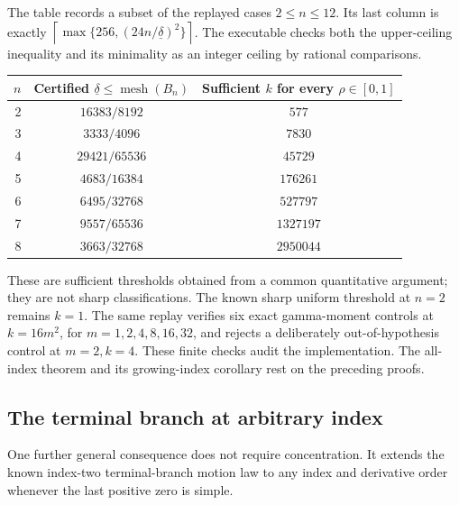 \documentclass[11pt,letterpaper]{article}
\theoremstyle{definition}
\theoremstyle{remark}
\begin{document}
The table records a subset of the replayed cases $2\leq n\leq12$.
Its last column is exactly
$\left\lceil\max\{256,(24n/\underline\delta)^2\}\right\rceil$.
The executable checks both the upper-ceiling inequality and its minimality
as an integer ceiling by rational comparisons.
\begin{center}
\begin{tabular}{rcc}
\hline
$n$ & Certified $\underline\delta\leq\operatorname{mesh}(B_n)$
 & Sufficient $k$ for every $\rho\in[0,1]$\\
\hline
2 & $16383/8192$ & $577$\\
3 & $3333/4096$ & $7830$\\
4 & $29421/65536$ & $45729$\\
5 & $4683/16384$ & $176261$\\
6 & $6495/32768$ & $527797$\\
7 & $9557/65536$ & $1327197$\\
8 & $3663/32768$ & $2950044$\\
\hline
\end{tabular}
\end{center}
These are sufficient thresholds obtained from a common quantitative
argument; they are not sharp classifications.  The known sharp uniform
threshold at $n=2$ remains $k=1$.  The same replay verifies six exact
gamma-moment controls at $k=16m^2$, for $m=1,2,4,8,16,32$, and rejects
a deliberately out-of-hypothesis control at $m=2,k=4$.
These finite checks audit the implementation.  The all-index theorem
and its growing-index corollary rest on the preceding proofs.

\subsection{The terminal branch at arbitrary index}

One further general consequence does not require concentration.  It
extends the known index-two terminal-branch motion law to any index and
derivative order whenever the last positive zero is simple.
\end{document}

